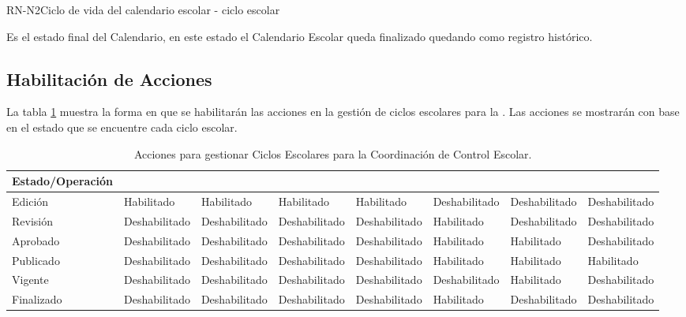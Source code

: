 \begin{BusinessRule}{RN-N2}{Ciclo de vida del calendario escolar - ciclo escolar}
{		 Es el estado final del Calendario, en este estado el Calendario Escolar queda finalizado quedando como registro histórico.
		
	}
	

\subsection{Habilitación de Acciones}
La tabla \ref{tb:iconosCicloEscolarA}  muestra la forma en que se habilitarán las acciones en la gestión de ciclos escolares para la . Las acciones se mostrarán con base en el estado que se encuentre cada ciclo escolar.\\

\begin{table} 
	\begin{center}
		\begin{tabular}{|l|l|l|l|l|l|l|l|}
			\hline
			Estado/Operación  & \btnGestionar & \btnEditar &  \cdtButton{Registrar} & \btnBorrar &\btnVer &\btnCheck &\btnVigente \\
			\hline \hline
			Edición & Habilitado & Habilitado & Habilitado & Habilitado & Deshabilitado & Deshabilitado & Deshabilitado\\ \hline
			Revisión & Deshabilitado & Deshabilitado & Deshabilitado & Deshabilitado & Habilitado & Deshabilitado & Deshabilitado\\ \hline
			Aprobado & Deshabilitado & Deshabilitado & Deshabilitado & Deshabilitado & Habilitado & Habilitado & Deshabilitado\\ \hline
			Publicado & Deshabilitado & Deshabilitado & Deshabilitado & Deshabilitado & Habilitado & Habilitado & Habilitado\\ \hline
			Vigente & Deshabilitado & Deshabilitado & Deshabilitado & Deshabilitado & Deshabilitado & Habilitado & Deshabilitado\\ \hline
			Finalizado & Deshabilitado & Deshabilitado & Deshabilitado & Deshabilitado & Habilitado& Deshabilitado & Deshabilitado\\ \hline
		\end{tabular}
		\caption{Acciones para gestionar Ciclos Escolares para la Coordinación de Control Escolar.}
		\hypertarget{tb:habilitarAcciones}{}
		\label{tb:iconosCicloEscolarA}
	\end{center}
\end{table}



\end{BusinessRule}
